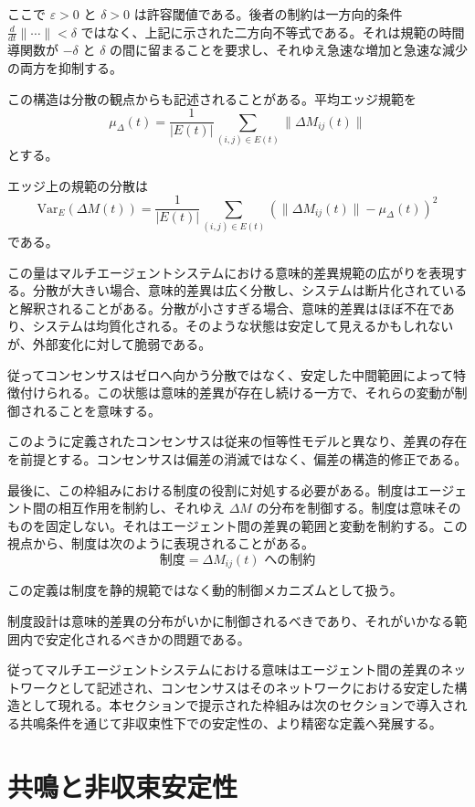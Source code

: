\documentclass[11pt,a4paper]{article}
\theoremstyle{definition}
\begin{document}
ここで $\varepsilon > 0$ と $\delta > 0$ は許容閾値である。後者の制約は一方向的条件 $\frac{d}{dt}\|\cdots\| < \delta$ ではなく、上記に示された二方向不等式である。それは規範の時間導関数が $-\delta$ と $\delta$ の間に留まることを要求し、それゆえ急速な増加と急速な減少の両方を抑制する。

この構造は分散の観点からも記述されることがある。平均エッジ規範を
\[
\mu_\Delta(t) = \frac{1}{|E(t)|} \sum_{(i,j) \in E(t)} \|\Delta M_{ij}(t)\|
\]
とする。

エッジ上の規範の分散は
\[
\text{Var}_E(\Delta M(t)) = \frac{1}{|E(t)|} \sum_{(i,j) \in E(t)} (\|\Delta M_{ij}(t)\| - \mu_\Delta(t))^2
\]
である。

この量はマルチエージェントシステムにおける意味的差異規範の広がりを表現する。分散が大きい場合、意味的差異は広く分散し、システムは断片化されていると解釈されることがある。分散が小さすぎる場合、意味的差異はほぼ不在であり、システムは均質化される。そのような状態は安定して見えるかもしれないが、外部変化に対して脆弱である。

従ってコンセンサスはゼロへ向かう分散ではなく、安定した中間範囲によって特徴付けられる。この状態は意味的差異が存在し続ける一方で、それらの変動が制御されることを意味する。

このように定義されたコンセンサスは従来の恒等性モデルと異なり、差異の存在を前提とする。コンセンサスは偏差の消滅ではなく、偏差の構造的修正である。

最後に、この枠組みにおける制度の役割に対処する必要がある。制度はエージェント間の相互作用を制約し、それゆえ $\Delta M$ の分布を制御する。制度は意味そのものを固定しない。それはエージェント間の差異の範囲と変動を制約する。この視点から、制度は次のように表現されることがある。
\[
\text{制度} = \text{$\Delta M_{ij}(t)$ への制約}
\]

この定義は制度を静的規範ではなく動的制御メカニズムとして扱う。

制度設計は意味的差異の分布がいかに制御されるべきであり、それがいかなる範囲内で安定化されるべきかの問題である。

従ってマルチエージェントシステムにおける意味はエージェント間の差異のネットワークとして記述され、コンセンサスはそのネットワークにおける安定した構造として現れる。本セクションで提示された枠組みは次のセクションで導入される共鳴条件を通じて非収束性下での安定性の、より精密な定義へ発展する。

\section{共鳴と非収束安定性}
\end{document}
